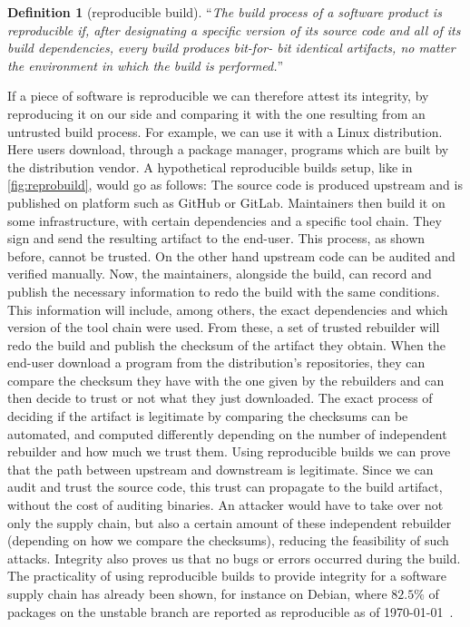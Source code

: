 \documentclass[a4paper,11pt,oneside]{report}
\theoremstyle{definition}
\newtheorem{definition}{Definition}[section]
\newcommand{\rb}{reproducible builds\xspace}
\begin{document}
\begin{definition}[reproducible build]
\label{def:reprobuild}
``\emph{The build process of a software
product is reproducible if, after designating a
specific version of its source code and all of its
build dependencies, every build produces bit-for-
bit identical artifacts, no matter the environment
in which the build is performed.}''~\cite{DBLP:journals/corr/abs-2104-06020}
\end{definition}

If a piece of software is reproducible we can therefore attest its integrity,
by reproducing it on our side and comparing it with the one resulting from an
untrusted build process. For example, we can use it with a Linux distribution.
Here users download, through a package manager, programs which are built by the
distribution vendor. A hypothetical \rb setup, like in
\autoref{fig:reprobuild}, would go as follows: The source code is produced
upstream and is published on platform such as GitHub or GitLab. Maintainers
then build it on some infrastructure, with certain dependencies and a specific
tool chain. They sign and send the resulting artifact to the end-user. This
process, as shown before, cannot be trusted. On the other hand upstream code
can be audited and verified manually. Now, the maintainers, alongside the
build, can record and publish the necessary information to redo the build
with the same conditions. This information will include, among others, the
exact dependencies and which version of the tool chain were used. From these, a
set of trusted rebuilder will redo the build and publish
the checksum of the artifact they obtain. When the end-user download a program
from the distribution's repositories, they can compare the checksum they have
with the one given by the rebuilders and can then decide to trust or not what
they just downloaded. The exact process of deciding if the artifact is
legitimate by comparing the checksums can be automated, and computed
differently depending on the number of independent rebuilder and how much we
trust them.
Using \rb we can prove that the path between upstream and downstream is
legitimate. Since we can audit and trust the source code, this trust can
propagate to the build artifact, without the cost of auditing binaries. An
attacker would have to take over not only the supply chain, but also a certain
amount of these independent rebuilder (depending on how we compare the
checksums), reducing the feasibility of such attacks. Integrity also proves us
that no bugs or errors occurred during the build. The practicality of using \rb
to provide integrity for a software supply chain has already been shown, for
instance on Debian, where $82.5\%$ of packages on the unstable branch are
reported as reproducible as of \today~\cite{debian:repro}.
\end{document}
